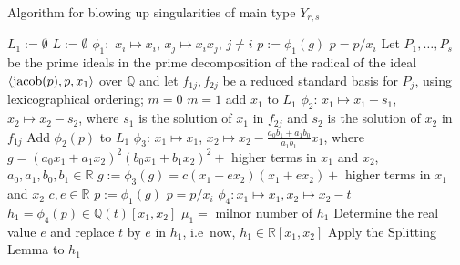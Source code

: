 \documentclass[noend]{amsproc}
\theoremstyle{definition}
\DeclareMathOperator{\m}{\mathfrak{m}}
\begin{document}
\begin{algorithm}[h]
\caption{Algorithm for blowing up singularities of main type $Y_{r,s}$\label{BlowingUp}}
\begin{algorithmic}[1]

\REQUIRE{ $g\in\m^3\subset\mathbb Q[x_1,x_2]$ of complex
singularity type $Y_{r,s}$.}
\STATE $L_1:=\emptyset$
\STATE $L:=\emptyset$
\STATE $\phi_1:$ $x_i\mapsto x_i$, $x_j\mapsto x_ix_j$,
$j\neq i$
\STATE $p:=\phi_1(g)$
\STATE $p=p/x_i$
\ENDWHILE
\STATE Let $P_1,\ldots,P_s$ be the prime ideals in the prime
decomposition
of the radical of the ideal
$\langle\textnormal{jacob}(p),p,x_1\rangle$ over $\mathbb Q$ and let
$f_{1j}, f_{2j}$ be a reduced standard basis for $P_j$, using
lexicographical
ordering;
\STATE $m=0$
\ELSE
\STATE $m=1$
\ENDIF
{}
\STATE add $x_1$ to $L_1$
\ENDIF
{}
\STATE $\phi_2$: $x_1\mapsto x_1-s_1$,
$x_2\mapsto x_2-s_2$, where $s_1$ is the solution of
$x_1$ in $f_{2j}$ and $s_2$ is the
solution of $x_2$ in $f_{1j}$
\STATE Add $\phi_2(p)$ to $L_1$
\ENDFOR
\ENDIF
\ENDFOR
\ELSE
\STATE $\phi_3$: $x_1\mapsto x_1$,
$x_2\mapsto x_2 -\frac{a_0b_1+a_1b_0}{a_1b_1}x_1$, where $g=(a_0x_1+a_1x_2)^2(b_0x_1+b_1x_2)^2+$ higher terms
in $x_1$ and $x_2$,
$a_0,a_1,b_0,b_1\in\mathbb R$
\STATE $g :=\phi_3(g)=c(x_1-ex_2)(x_1+ex_2)+$ higher terms
in $x_1$ and $x_2$ $c,e\in\mathbb R$
\STATE $p:=\phi_1(g)$
\STATE $p=p/x_i$
\ENDWHILE
\STATE $\phi_4: x_1\mapsto x_1, x_2\mapsto x_2-t$
\STATE $h_1=\phi_4(p)\in\mathbb Q(t)[x_1,x_2]$
\STATE $\mu_1 = $ milnor number of $h_1$
\STATE Determine the real value $e$ and replace $t$ by $e$
in $h_1$,
i.e~now, $h_1\in\mathbb R[x_1,x_2]$
\STATE Apply the Splitting Lemma to $h_1$

\end{algorithmic}
\end{algorithm}
\end{document}
